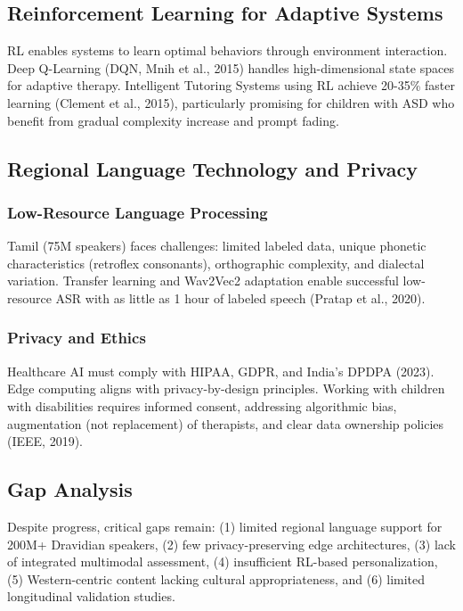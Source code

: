 \documentclass[12pt,a4paper]{article}
\begin{document}
\subsection{Reinforcement Learning for Adaptive Systems}

RL enables systems to learn optimal behaviors through environment interaction. Deep Q-Learning (DQN, Mnih et al., 2015) handles high-dimensional state spaces for adaptive therapy. Intelligent Tutoring Systems using RL achieve 20-35\% faster learning (Clement et al., 2015), particularly promising for children with ASD who benefit from gradual complexity increase and prompt fading.

\subsection{Regional Language Technology and Privacy}

\subsubsection{Low-Resource Language Processing}

Tamil (75M speakers) faces challenges: limited labeled data, unique phonetic characteristics (retroflex consonants), orthographic complexity, and dialectal variation. Transfer learning and Wav2Vec2 adaptation enable successful low-resource ASR with as little as 1 hour of labeled speech (Pratap et al., 2020).

\subsubsection{Privacy and Ethics}

Healthcare AI must comply with HIPAA, GDPR, and India's DPDPA (2023). Edge computing aligns with privacy-by-design principles. Working with children with disabilities requires informed consent, addressing algorithmic bias, augmentation (not replacement) of therapists, and clear data ownership policies (IEEE, 2019).

\subsection{Gap Analysis}

Despite progress, critical gaps remain: (1) limited regional language support for 200M+ Dravidian speakers, (2) few privacy-preserving edge architectures, (3) lack of integrated multimodal assessment, (4) insufficient RL-based personalization, (5) Western-centric content lacking cultural appropriateness, and (6) limited longitudinal validation studies.
\end{document}

